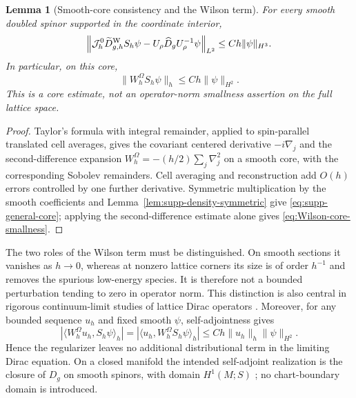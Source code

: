 \documentclass[11pt]{article}
\newtheorem{lemma}[lemma]{Lemma}
\theoremstyle{definition}
\theoremstyle{remark}
\theoremstyle{definition}
\theoremstyle{remark}
\begin{document}
\begin{lemma}[Smooth-core consistency and the Wilson term]
\label{lem:supp-general-core}
For every smooth doubled spinor supported in the coordinate interior,
\begin{equation}
 \left\|\mathcal J_h^0\widetilde D_{g,h}^{\rm W}S_h\psi
       -U_\rho\widehat D_gU_\rho^{-1}\psi\right\|_{L^2}
       \le Ch\|\psi\|_{H^3}.
 \label{eq:supp-general-core}
\end{equation}
In particular, on this core,
\begin{equation}
 \|W_h^\Omega S_h\psi\|_h\le Ch\|\psi\|_{H^2}.
 \label{eq:Wilson-core-smallness}
\end{equation}
This is a core estimate, not an operator-norm smallness assertion on the full
lattice space.
\end{lemma}

\begin{proof}
Taylor's formula with integral remainder, applied to spin-parallel translated
cell averages, gives the covariant centered derivative $-i\nabla_j$ and the
second-difference expansion $W_h^\Omega=-(h/2)\sum_j\nabla_j^2$ on a smooth
core, with the corresponding Sobolev remainders.  Cell averaging and
reconstruction add $O(h)$ errors controlled by one further derivative.
Symmetric multiplication by the smooth coefficients and
Lemma~\ref{lem:supp-density-symmetric} give
\eqref{eq:supp-general-core}; applying the second-difference estimate alone
gives \eqref{eq:Wilson-core-smallness}.
\end{proof}

The two roles of the Wilson term must be distinguished.  On smooth sections it
vanishes as $h\to0$, whereas at nonzero lattice corners its size is of order
$h^{-1}$ and removes the spurious low-energy species.  It is therefore not a
bounded perturbation tending to zero in operator norm.  This distinction is
also central in rigorous continuum-limit studies of lattice Dirac operators
\cite{nielsenninomiya1981a,nielsenninomiya1981b,Nakamura2024}.  Moreover, for any bounded sequence $u_h$ and fixed smooth
$\psi$, self-adjointness gives
\[
 |\langle W_h^\Omega u_h,S_h\psi\rangle_h|
 =|\langle u_h,W_h^\Omega S_h\psi\rangle_h|
 \le Ch\|u_h\|_h\|\psi\|_{H^2}.
\]
Hence the regularizer leaves no additional distributional term in the limiting
Dirac equation.  On a closed manifold the intended self-adjoint realization is
the closure of $D_g$ on smooth spinors, with domain $H^1(M;S)$
\cite{lawson-michelsohn}; no chart-boundary domain is introduced.
\end{document}
